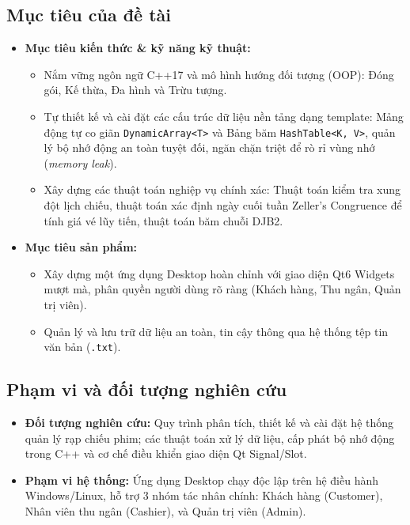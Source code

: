 \documentclass[12pt,a4paper]{article}
\begin{document}
\subsection{Mục tiêu của đề tài}
\begin{itemize}
    \item \textbf{Mục tiêu kiến thức \& kỹ năng kỹ thuật:}
    \begin{itemize}
        \item Nắm vững ngôn ngữ C++17 và mô hình hướng đối tượng (OOP): Đóng gói, Kế thừa, Đa hình và Trừu tượng.
        \item Tự thiết kế và cài đặt các cấu trúc dữ liệu nền tảng dạng template: Mảng động tự co giãn \texttt{DynamicArray<T>} và Bảng băm \texttt{HashTable<K, V>}, quản lý bộ nhớ động an toàn tuyệt đối, ngăn chặn triệt để rò rỉ vùng nhớ (\textit{memory leak}).
        \item Xây dựng các thuật toán nghiệp vụ chính xác: Thuật toán kiểm tra xung đột lịch chiếu, thuật toán xác định ngày cuối tuần Zeller's Congruence để tính giá vé lũy tiến, thuật toán băm chuỗi DJB2.
    \end{itemize}
    \item \textbf{Mục tiêu sản phẩm:}
    \begin{itemize}
        \item Xây dựng một ứng dụng Desktop hoàn chỉnh với giao diện Qt6 Widgets mượt mà, phân quyền người dùng rõ ràng (Khách hàng, Thu ngân, Quản trị viên).
        \item Quản lý và lưu trữ dữ liệu an toàn, tin cậy thông qua hệ thống tệp tin văn bản (\texttt{.txt}).
    \end{itemize}
\end{itemize}

\subsection{Phạm vi và đối tượng nghiên cứu}
\begin{itemize}
    \item \textbf{Đối tượng nghiên cứu:} Quy trình phân tích, thiết kế và cài đặt hệ thống quản lý rạp chiếu phim; các thuật toán xử lý dữ liệu, cấp phát bộ nhớ động trong C++ và cơ chế điều khiển giao diện Qt Signal/Slot.
    \item \textbf{Phạm vi hệ thống:} Ứng dụng Desktop chạy độc lập trên hệ điều hành Windows/Linux, hỗ trợ 3 nhóm tác nhân chính: Khách hàng (Customer), Nhân viên thu ngân (Cashier), và Quản trị viên (Admin).
\end{itemize}
\end{document}
